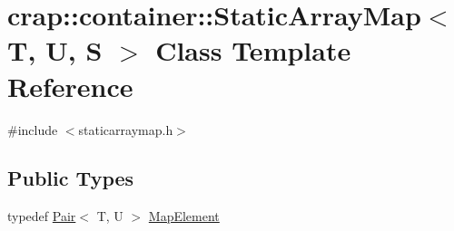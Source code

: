 \hypertarget{classcrap_1_1container_1_1_static_array_map}{\section{crap\-:\-:container\-:\-:Static\-Array\-Map$<$ T, U, S $>$ Class Template Reference}
\label{classcrap_1_1container_1_1_static_array_map}
}


{\ttfamily \#include $<$staticarraymap.\-h$>$}

\subsection*{Public Types}
\begin{DoxyCompactItemize}
\item 
typedef \hyperlink{structcrap_1_1container_1_1_pair}{Pair}$<$ T, U $>$ \hyperlink{classcrap_1_1container_1_1_static_array_map_aef770c84a2c91625ee6c423672a1f21c}{Map\-Element}
\end{DoxyCompactItemize}
